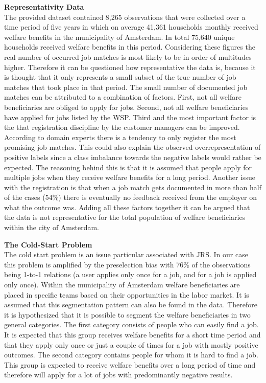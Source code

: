 \noindent
\textbf{Representativity Data}\\
The provided dataset contained 8,265 observations that were collected over a time period of five years in which on average 41,361 households monthly received welfare benefits in the municipality of Amsterdam.
In total 75,640 unique households received welfare benefits in this period.
Considering these figures the real number of occurred job matches is most likely to be in order of multitudes higher.
Therefore it can be questioned how representative the data is, because it is thought that it only represents a small subset of the true number of job matches that took place in that period.  
The small number of documented job matches can be attributed to a combination of factors.
First, not all welfare beneficiaries are obliged to apply for jobs.
Second, not all welfare beneficiaries have applied for jobs listed by the WSP.
Third and the most important factor is the that registration discipline by the customer managers can be improved.
According to domain experts there is a tendency to only register the most promising job matches.
This could also explain the observed overrepresentation of positive labels since a class imbalance towards the negative labels would rather be expected.
The reasoning behind this is that it is assumed that people apply for multiple jobs when they receive welfare benefits for a long period. 
Another issue with the registration is that when a job match gets documented in more than half of the cases (54\%) there is eventually no feedback received from the employer on what the outcome was.
Adding all these factors together it can be argued that the data is not representative for the total population of welfare beneficiaries within the city of Amsterdam. 

\noindent
\textbf{The Cold-Start Problem}\\
The cold start problem is an issue particular associated with JRS. In our case this problem is amplified by the preselection bias with 76\% of the observations being 1-to-1 relations (a user applies only once for a job, and for a job is applied only once). 
Within the municipality of Amsterdam welfare beneficiaries are placed in specific teams based on their opportunities in the labor market.
It is assumed that this segmentation pattern can also be found in the data.
Therefore it is hypothesized that it is possible to segment the welfare beneficiaries in two general categories.
The first category consists of people who can easily find a job. 
It is expected that this group receives welfare benefits for a short time period and that they apply only once or just a couple of times for a job with mostly positive outcomes. 
The second category contains people for whom it is hard to find a job. 
This group is expected to receive welfare benefits over a long period of time and therefore will apply for a lot of jobs with predominantly negative results.

